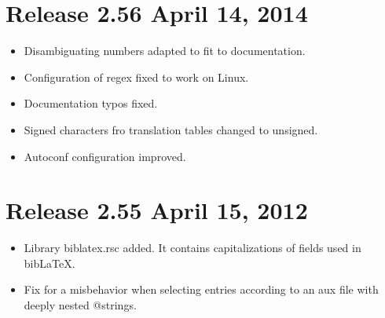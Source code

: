 \documentclass[11pt,a4paper]{scrartcl}
\newcommand\File[1]{\textsf{#1}}
\newenvironment{Release}[2]{%
  \def\tmp{#2}%
  \section*{Release #1 \ifx\tmp\empty\else{\normalsize[#2]}\fi}
  \begin{itemize}
}{\end{itemize}}
\newenvironment{Fix}[1]{\item }{}
\newenvironment{New}[1]{\item }{}
\begin{document}
\begin{multicols}
 \begin{Release}{2.56}{April 14, 2014}
  \begin{Fix}{gene}
    Disambiguating numbers adapted to fit to documentation.
  \end{Fix}
  \begin{Fix}{gene}
    Configuration of regex fixed to work on Linux.
  \end{Fix}
  \begin{Fix}{gene}
    Documentation typos fixed.
  \end{Fix}
  \begin{Fix}{gene}
    Signed characters fro translation tables changed to unsigned.
  \end{Fix}
  \begin{Fix}{gene}
    Autoconf configuration improved.
  \end{Fix}
 \end{Release}

 \begin{Release}{2.55}{April 15, 2012}
  \begin{New}{gene}
    Library \File{biblatex.rsc} added. It contains capitalizations of
    fields used in bib\LaTeX.
  \end{New}
  \begin{Fix}{gene}
    Fix for a misbehavior when selecting entries according to an aux file
    with deeply nested @strings.
  \end{Fix}
 \end{Release}


\end{multicols}
\end{document}
